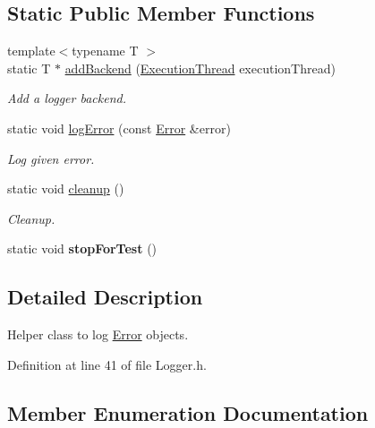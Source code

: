 \subsection*{Static Public Member Functions}
\begin{DoxyCompactItemize}
\item 
{\footnotesize template$<$typename T $>$ }\\static T $\ast$ \hyperlink{class_mdt_1_1_error_logger_1_1_logger_ae011d85c251d55660c3f90f21d1ab2a6}{add\+Backend} (\hyperlink{class_mdt_1_1_error_logger_1_1_logger_ab6d6198b43b2bb94cede114ec67b781c}{Execution\+Thread} execution\+Thread)
\begin{DoxyCompactList}\small\item\em Add a logger backend. \end{DoxyCompactList}\item 
static void \hyperlink{class_mdt_1_1_error_logger_1_1_logger_aa06a24a1d521258729ca172465b02040}{log\+Error} (const \hyperlink{class_mdt_1_1_error}{Error} \&error)
\begin{DoxyCompactList}\small\item\em Log given error. \end{DoxyCompactList}\item 
static void \hyperlink{class_mdt_1_1_error_logger_1_1_logger_a3bb1951ee52da826fde82dab52d54c4b}{cleanup} ()
\begin{DoxyCompactList}\small\item\em Cleanup. \end{DoxyCompactList}\item 
static void {\bfseries stop\+For\+Test} ()\hypertarget{class_mdt_1_1_error_logger_1_1_logger_a7724e2f06e28a05fc92a8eb23eccda87}{}\label{class_mdt_1_1_error_logger_1_1_logger_a7724e2f06e28a05fc92a8eb23eccda87}

\end{DoxyCompactItemize}


\subsection{Detailed Description}
Helper class to log \hyperlink{class_mdt_1_1_error}{Error} objects. 

Definition at line 41 of file Logger.\+h.



\subsection{Member Enumeration Documentation}
